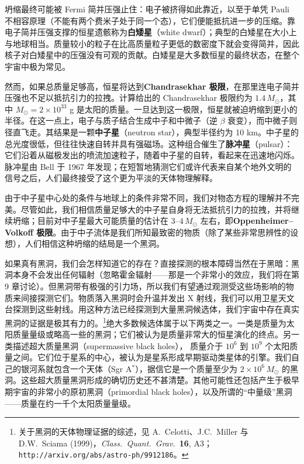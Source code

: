坍缩最终可能被 Fermi 简并压强止住：电子被挤得如此靠近，以至于单凭 Pauli 不相容原理（不能有两个费米子处于同一个态），它们便能抵抗进一步的压缩。靠电子简并压强支撑的恒星遗骸称为\textbf{白矮星}（white dwarf）；典型的白矮星在大小上与地球相当。质量较小的粒子在比高质量粒子更低的数密度下就会变得简并，因此核子对白矮星中的压强没有可观的贡献。白矮星是大多数恒星的最终状态，在整个宇宙中极为常见。

然而，如果总质量足够高，恒星将达到\textbf{Chandrasekhar 极限}，在那里连电子简并压强也不足以抵抗引力的拉拽。计算给出的 Chandrasekhar 极限约为 $1.4\,M_{\odot}$，其中 $M_{\odot} = 2\times 10^{33}$ g 是太阳的质量。一旦达到这一极限，恒星就被迫坍缩到更小的半径。在这一点上，电子与质子结合生成中子和中微子（逆 $\beta$ 衰变），而中微子则径直飞走。其结果是一颗\textbf{中子星}（neutron star），典型半径约为 10 km。中子星的总光度很低，但往往快速自转并具有强磁场。这种组合催生了\textbf{脉冲星}（pulsar）：它们沿着从磁极发出的喷流加速粒子，随着中子星的自转，看起来在迅速地闪烁。脉冲星由 Bell 于 1967 年发现；在短暂地猜测它们或许代表来自某个地外文明的信号之后，人们最终接受了这个更为平淡的天体物理解释。

由于中子星中心处的条件与地球上的条件非常不同，我们对物态方程的理解并不完美。尽管如此，我们相信质量足够大的中子星自身将无法抵抗引力的拉拽，并将继续坍缩；目前对中子星最大可能质量的估计在 $3$--$4\,M_{\odot}$ 左右，即\textbf{Oppenheimer--Volkoff 极限}。由于中子流体是我们所知最致密的物质（除了某些非常思辨性的设想），人们相信这种坍缩的结局是一个黑洞。

如果真有黑洞，我们会怎样知道它的存在？直接探测的根本障碍当然在于黑暗：黑洞本身不会发出任何辐射（忽略霍金辐射——那是一个非常小的效应，我们将在第 9 章讨论）。但黑洞带有极强的引力场，所以我们有望通过观测受这些场影响的物质来间接探测它们。物质落入黑洞时会升温并发出 X 射线，我们可以用卫星天文台探测到这些射线。用这种方法已经探测到大量黑洞候选体，我们宇宙中存在真实黑洞的证据是极其有力的。\footnote{关于黑洞的天体物理证据的综述，见 A.~Celotti、J.C.~Miller 与 D.W.~Sciama (1999)，\emph{Class.~Quant.~Grav.}~\textbf{16}, A3；\texttt{http://arxiv.org/abs/astro-ph/9912186}。}绝大多数候选体属于以下两类之一。一类是质量为太阳质量量级或略高一些的黑洞；它们被认为是质量非常大的恒星演化的终点。另一类描述超大质量黑洞（supermassive black holes），
质量介于 $10^6$ 到 $10^9$ 个太阳质量之间。它们位于星系的中心，被认为是星系形成早期驱动类星体的引擎。我们自己的银河系就包含一个天体（Sgr A$^*$），据信它是一个质量至少为 $2\times 10^6\,M_{\odot}$ 的黑洞。这些超大质量黑洞形成的确切历史还不甚清楚。其他可能性还包括产生于极早期宇宙的非常小的原初黑洞（primordial black holes），以及所谓的“中量级”黑洞——质量在约一千个太阳质量量级。

